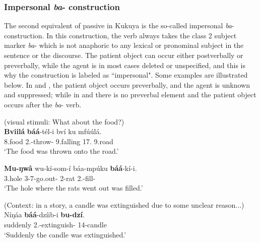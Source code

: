 \documentclass[output=paper,colorlinks,citecolor=brown,
]{langscibook}
\begin{document}
\subsubsection{Impersonal \textit{ba}- construction}\label{teke:sec:4.2.2}
The second equivalent of passive in Kukuya is the so-called impersonal \textit{ba}- construction. In this construction, the verb always takes the class 2 subject marker \textit{ba}- which is not anaphoric to any lexical or pronominal subject in the sentence or the discourse. The patient object can occur either postverbally or preverbally, while the agent is in most cases deleted or unspecified, and this is why the construction is labeled as ``impersonal". Some examples are illustrated below. In  and , the patient object occurs preverbally, and the agent is unknown and suppressed; while in  and  there is no preverbal element and the patient object occurs after the \textit{ba}- verb.
\begin{exe}
\ex
\label{124}
 (visual stimuli: What about the food?) \\
\gll
\textbf{Bviilá} \textbf{báá}-tél-i bví ku mfúúlá.\\
8.food 2\Sm{}.\Pst{}-throw-\Pst{} 9.falling 17.\Loc{} 9.road\\
\trans ‘The food was thrown onto the road.’

\end{exe}
\begin{exe}
\ex
\label{125}
\gll
\textbf{Mu-ŋwâ} wu-kí-som-í báa-mpúku \textbf{báá}-kí-i.\\
3.hole 3\Rel{}-7\Sm{}-go.out-\Pst{} 2-rat 2\Sm{}.\Pst{}-fill-\Pst{}\\
\trans ‘The hole where the rats went out was filled.’

\end{exe}
\begin{exe}
\ex
\label{126}
 (Context: in a story, a candle was extinguished due to some unclear reason...)\\
\gll
Níŋáa \textbf{báá}-dzíib-i \textbf{bu-dzí}.\\
suddenly 2\Sm{}.\Pst{}-extinguish-\Pst{} 14-candle\\
\trans ‘Suddenly the candle was extinguished.’ 

\end{exe}
\end{document}
